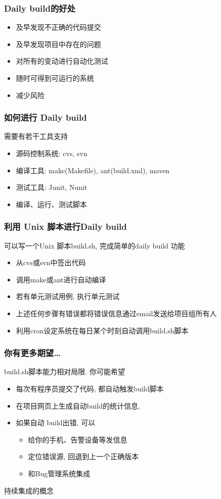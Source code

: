 \documentclass[compress]{beamer}
\begin{document}
\begin{frame}
  \frametitle{Daily build的好处}
  \begin{itemize}
	\item 及早发现不正确的代码提交
	\item 及早发现项目中存在的问题
	\item 对所有的变动进行自动化测试
	\item 随时可得到可运行的系统
	\item 减少风险
  \end{itemize}
\end{frame}

\begin{frame}
  \frametitle{如何进行 Daily build}
  需要有若干工具支持
  \begin{itemize}
	\item 源码控制系统: cvs, svn
	\item 编译工具: make(Makefile), ant(build.xml), maven
	\item 测试工具: Junit, Nunit
	\item 编译、运行、测试脚本
  \end{itemize}
\end{frame}

\begin{frame}
  \frametitle{利用 Unix 脚本进行Daily build}
  可以写一个Unix 脚本build.sh, 完成简单的daily build 功能
  \begin{itemize}
	\item 从cvs或svn中签出代码
	\item 调用make或ant进行自动编译
	\item 若有单元测试用例, 执行单元测试
	\item 上述任何步骤有错误都将错误信息通过email发送给项目组所有人
	\item 利用\alert{cron}设定系统在每日某个时刻自动调用build.sh脚本
  \end{itemize}
  
\end{frame}

\begin{frame}
  \frametitle{你有更多期望\dots}
  build.sh脚本能力相对局限. 你可能希望 
  \begin{itemize}
	\item 每次有程序员提交了代码, 都自动触发build脚本
	\item 在项目网页上生成自动build的统计信息, 
	\item 如果自动 build出错, 可以
	  \begin{itemize}
		\item 给你的手机、告警设备等发信息
		\item 定位错误源, 回退到上一个正确版本
		\item 和Bug管理系统集成
	  \end{itemize}
  \end{itemize}
 持续集成的概念
  
\end{frame}
\end{document}
